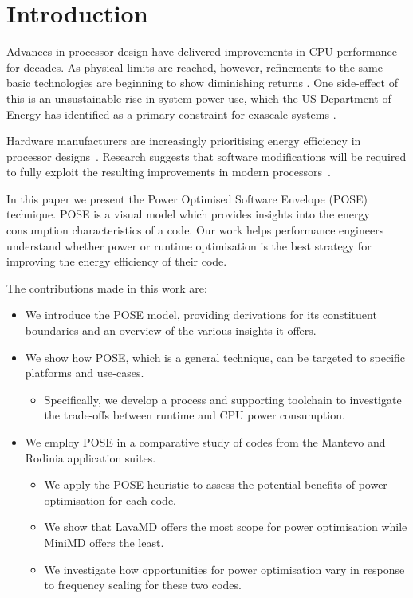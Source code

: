 \section{Introduction}
Advances in processor design have delivered improvements in CPU performance for decades. As physical limits are reached, however, refinements to the same basic technologies are beginning to show diminishing returns \cite{esmaeilzadeh:2011aa}. One side-effect of this is an unsustainable rise in system power use, which the US Department of Energy has identified as a primary constraint for exascale systems \cite{shalf:2011aa}.

Hardware manufacturers are increasingly prioritising energy efficiency in processor designs~\cite{kurd:2014aa}. 
Research suggests that software modifications will be required to fully exploit the resulting improvements in modern processors~\cite{shao:2013aa}.

In this paper we present the Power Optimised Software Envelope (POSE) technique.
POSE is a visual model which provides insights into the energy consumption characteristics of a code.
Our work helps performance engineers understand whether power or runtime optimisation is the best strategy for improving the energy efficiency of their code.

\medskip \noindent
The contributions made in this work are:
\begin{itemize}
  \item We introduce the POSE model, providing derivations for its constituent boundaries and an overview of the various insights it offers.
  \item We show how POSE, which is a general technique, can be targeted to specific platforms and use-cases. 
  \begin{itemize}
    \item Specifically, we develop a process and supporting toolchain to investigate the trade-offs between runtime and CPU power consumption.
  \end{itemize}
  \item We employ POSE in a comparative study of codes from the Mantevo and Rodinia application suites.
  \begin{itemize}
    \item We apply the POSE heuristic to assess the potential benefits of power optimisation for each code.
    \item We show that LavaMD offers the most scope for power optimisation while MiniMD offers the least.
    \item We investigate how opportunities for power optimisation vary in response to frequency scaling for these two codes.
  \end{itemize}
\end{itemize}


